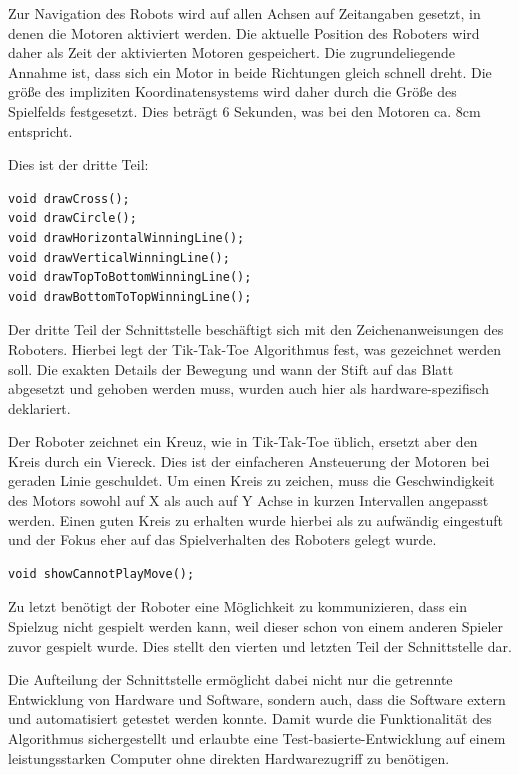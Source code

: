 \documentclass[conference,compsoc,final,a4paper]{IEEEtran}
\begin{document}
Zur Navigation des Robots wird auf allen Achsen auf Zeitangaben gesetzt, in denen die Motoren aktiviert werden. Die
aktuelle Position des Roboters wird daher als Zeit der aktivierten Motoren gespeichert. Die zugrundeliegende Annahme
ist, dass sich ein Motor in beide Richtungen gleich schnell dreht. Die größe des impliziten Koordinatensystems wird
daher durch die Größe des Spielfelds festgesetzt. Dies beträgt 6 Sekunden, was bei den Motoren ca. 8cm entspricht.

Dies ist der dritte Teil:

\begin{verbatim}
void drawCross();
void drawCircle();
void drawHorizontalWinningLine();
void drawVerticalWinningLine();
void drawTopToBottomWinningLine();
void drawBottomToTopWinningLine();
\end{verbatim}

Der dritte Teil der Schnittstelle beschäftigt sich mit den Zeichenanweisungen des Roboters. Hierbei legt der
Tik-Tak-Toe Algorithmus fest, was gezeichnet werden soll. Die exakten Details der Bewegung und wann der Stift
auf das Blatt abgesetzt und gehoben werden muss, wurden auch hier als hardware-spezifisch deklariert.

Der Roboter zeichnet ein Kreuz, wie in Tik-Tak-Toe üblich, ersetzt aber den Kreis durch ein Viereck. Dies ist
der einfacheren Ansteuerung der Motoren bei geraden Linie geschuldet. Um einen Kreis zu zeichen, muss die
Geschwindigkeit des Motors sowohl auf X als auch auf Y Achse in kurzen Intervallen angepasst werden. Einen 
guten Kreis zu erhalten wurde hierbei als zu aufwändig eingestuft und der Fokus eher auf das Spielverhalten
des Roboters gelegt wurde.

\begin{verbatim}
void showCannotPlayMove();
\end{verbatim}

Zu letzt benötigt der Roboter eine Möglichkeit zu kommunizieren, dass ein Spielzug nicht gespielt werden kann,
weil dieser schon von einem anderen Spieler zuvor gespielt wurde. Dies stellt den vierten und letzten Teil der
Schnittstelle dar.

Die Aufteilung der Schnittstelle ermöglicht dabei nicht nur die getrennte Entwicklung von Hardware und Software,
sondern auch, dass die Software extern und automatisiert getestet werden konnte. Damit wurde die Funktionalität des Algorithmus
sichergestellt und erlaubte eine Test-basierte-Entwicklung auf einem leistungsstarken Computer ohne direkten
Hardwarezugriff zu benötigen.
\end{document}
